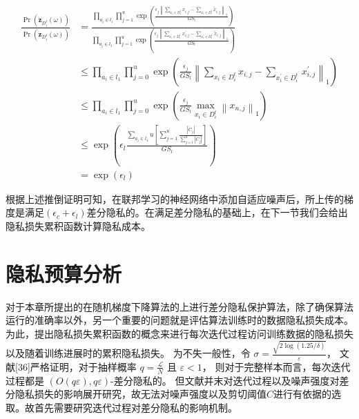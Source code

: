 \begin{equation}
\begin{aligned}
\frac{\operatorname{Pr}\left(\ddot{\mathbf{z}}_{D_{i}^{t}}(\omega)\right)}{\operatorname{Pr}\left(\ddot{\mathbf{z}}_{D_{i}^{t}}(\omega)\right)} &=\frac{\prod_{a_{i} \in l_{1}} \prod_{j=1}^{u} \exp \left(\frac{\epsilon_{j}\left\|\sum_{x_{i} \in D_{i}^{t}} x_{i, j}-\sum_{x_{i} \in D_{i}^{t}} \tilde{x}_{i, j}\right\|_{1}}{G S_{l}}\right)}{\prod_{a_{i} \in l_{1}} \prod_{j=1}^{u} \exp \left(\frac{\epsilon_{j}\left\|\sum_{x_{i}^{\prime} \in D_{i}^{t^{\prime}}} x_{i, j}^{\prime}-\sum_{x_{i}^{\prime} \in D_{i}^{t^{\prime}}} \tilde{x}_{i, j}^{\prime}\right\|_{1}}{G S_{l}}\right)} \\
& \leq \prod_{a_{i} \in l_{1}} \prod_{j=0}^{u} \exp \left(\frac{\epsilon_{j}}{G S_{l}}\left\|\sum_{x_{i} \in D_{i}^{t}} x_{i, j}-\sum_{x_{i}^{\prime} \in D_{i}^{t^{\prime}}} x_{i, j}^{\prime}\right\|_{1}\right) \\
& \leq \prod_{a_{i} \in l_{1}} \prod_{j=0}^{u} \exp \left(\frac{\epsilon_{j}}{G S_{l}} \max _{x_{i} \in D_{i}^{t}}\left\|x_{n, j}\right\|_{1}\right) \\
& \leq \exp \left(\epsilon_{l} \frac{\sum_{a_{i} \in l_{1}} u\left[\sum_{j=1}^{u} \frac{\left|\ddot{C}_{j}\right|}{\sum_{j=1}^{u}\left|\ddot{C}_{j}\right|}\right]}{G S_{l}}\right) \\
&=\exp \left(\epsilon_{l}\right)
\end{aligned}
\end{equation}

根据上述推倒证明可知，在联邦学习的神经网络中添加自适应噪声后，所上传的梯度是满足$\left(\epsilon_{c}+\epsilon_{l}\right)$差分隐私的。在满足差分隐私的基础上，在下一节我们会给出隐私损失累积函数计算隐私成本。

\section{隐私预算分析}
对于本章所提出的在随机梯度下降算法的上进行差分隐私保护算法，除了确保算法运行的准确率以外，另一个重要的问题就是评估算法训练时的数据隐私损失成本。为此，提出隐私损失累积函数的概念来进行每次迭代过程访问训练数据的隐私损失以及随着训练进展时的累积隐私损失。
为不失一般性，令 $\sigma=\frac{\sqrt{2 \log (1.25 / \delta)}}{\varepsilon}$， 文献[36]严格证明，对于抽样概率 $q=\frac{\mathcal{L}}{N}$ 且 $\varepsilon<1$， 则对于完整样本而言，每次迭代过程都是 $(O(q \varepsilon),q \varepsilon)$-差分隐私的。 但文献并末对迭代过程以及噪声强度对差分隐私损失的影响展开研究，故无法对噪声强度以及剪切阈值$C$进行有依据的选取。故首先需要研究迭代过程对差分隐私的影响机制。

